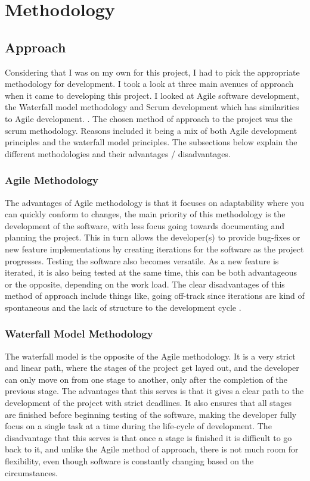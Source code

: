 \chapter{Methodology}
\section{Approach}Considering that I was on my own for this project, I had to pick the appropriate methodology for development. I took a look at three main avenues of approach when it came to developing this project. I looked at Agile software development, the Waterfall model methodology and Scrum development which has similarities to Agile development. \cite{agile}\cite{waterfall}\cite{scrum}. The chosen method of approach to the project was the scrum methodology. Reasons included it being a mix of both Agile development principles and the waterfall model principles. The subsections below explain the different methodologies and their advantages / disadvantages.

\subsection{Agile Methodology}
The advantages of Agile methodology is that it focuses on adaptability where you can quickly conform to changes, the main priority of this methodology is the development of the software, with less focus going towards documenting and planning the project. This in turn allows the developer(s) to provide bug-fixes or new feature implementations by creating iterations for the software as the project progresses. Testing the software also becomes versatile. As a new feature is iterated, it is also being tested at the same time, this can be both advantageous or the opposite, depending on the work load. The clear disadvantages of this method of approach include things like, going off-track since iterations are kind of spontaneous and the lack of structure to the development cycle \cite{agile}.

\subsection{Waterfall Model Methodology}
The waterfall model is the opposite of the Agile methodology. It is a very strict and linear path, where the stages of the project get layed out, and the developer can only move on from one stage to another, only after the completion of the previous stage. The advantages that this serves is that it gives a clear path to the development of the project with strict deadlines. It also ensures that all stages are finished before beginning testing of the software, making the developer fully focus on a single task at a time during the life-cycle of development. The disadvantage that this serves is that once a stage is finished it is difficult to go back to it, and unlike the Agile method of approach, there is not much room for flexibility, even though software is constantly changing based on the circumstances\cite{waterfall}.

